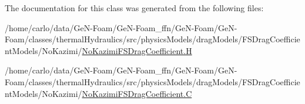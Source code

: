 The documentation for this class was generated from the following files\+:\begin{DoxyCompactItemize}
\item 
/home/carlo/data/\+Ge\+N-\/\+Foam/\+Ge\+N-\/\+Foam\+\_\+ffn/\+Ge\+N-\/\+Foam/\+Ge\+N-\/\+Foam/classes/thermal\+Hydraulics/src/physics\+Models/drag\+Models/\+F\+S\+Drag\+Coefficient\+Models/\+No\+Kazimi/\hyperlink{NoKazimiFSDragCoefficient_8H}{No\+Kazimi\+F\+S\+Drag\+Coefficient.\+H}\item 
/home/carlo/data/\+Ge\+N-\/\+Foam/\+Ge\+N-\/\+Foam\+\_\+ffn/\+Ge\+N-\/\+Foam/\+Ge\+N-\/\+Foam/classes/thermal\+Hydraulics/src/physics\+Models/drag\+Models/\+F\+S\+Drag\+Coefficient\+Models/\+No\+Kazimi/\hyperlink{NoKazimiFSDragCoefficient_8C}{No\+Kazimi\+F\+S\+Drag\+Coefficient.\+C}\end{DoxyCompactItemize}
